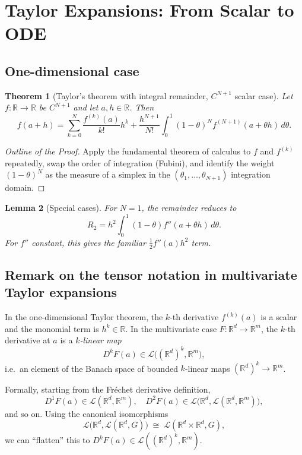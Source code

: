 \documentclass[12pt]{article}
\newtheorem{theorem}{Theorem}[section]
\newtheorem{lemma}[theorem]{Lemma}
\begin{document}
\section{Taylor Expansions: From Scalar to ODE}

\subsection{One-dimensional case}

\begin{theorem}[Taylor's theorem with integral remainder, $C^{N+1}$ scalar case]
Let $f:\mathbb{R} \to \mathbb{R}$ be $C^{N+1}$ and let $a,h \in \mathbb{R}$. Then
\[
f(a+h) = \sum_{k=0}^N \frac{f^{(k)}(a)}{k!} h^k 
+ \frac{h^{N+1}}{N!} \int_0^1 (1-\theta)^N f^{(N+1)}(a + \theta h)\,d\theta.
\]
\end{theorem}

\begin{proof}[Outline of the Proof]
Apply the fundamental theorem of calculus to $f$ and $f^{(k)}$ repeatedly, 
swap the order of integration (Fubini), and identify the weight $(1-\theta)^N$ 
as the measure of a simplex in the $(\theta_1,\dots,\theta_{N+1})$ integration domain.
\end{proof}

\begin{lemma}[Special cases]
For $N=1$, the remainder reduces to
\[
R_2 = h^2 \int_0^1 (1-\theta) f''(a+\theta h)\,d\theta.
\]
For $f''$ constant, this gives the familiar $\frac{1}{2}f''(a)h^2$ term.
\end{lemma}

\medskip

\subsection*{Remark on the tensor notation in multivariate Taylor expansions}

In the one-dimensional Taylor theorem, the $k$-th derivative $f^{(k)}(a)$ is a scalar 
and the monomial term is $h^k \in \mathbb{R}$. 
In the multivariate case $F:\mathbb{R}^d \to \mathbb{R}^m$, the $k$-th derivative 
at $a$ is a \emph{$k$-linear map} 
\[
D^kF(a) \in \mathcal{L}\big((\mathbb{R}^d)^k, \mathbb{R}^m\big),
\]
i.e.\ an element of the Banach space of bounded $k$-linear maps 
$(\mathbb{R}^d)^k \to \mathbb{R}^m$.

Formally, starting from the Fr\'echet derivative definition,
\[
D^1F(a) \in \mathcal{L}(\mathbb{R}^d, \mathbb{R}^m), \quad
D^2F(a) \in \mathcal{L}\big(\mathbb{R}^d, \mathcal{L}(\mathbb{R}^d, \mathbb{R}^m)\big),
\]
and so on. Using the canonical isomorphisms
\[
\mathcal{L}\big(\mathbb{R}^d, \mathcal{L}(\mathbb{R}^d, G)\big) 
\;\cong\; \mathcal{L}(\mathbb{R}^d \times \mathbb{R}^d, G),
\]
we can ``flatten'' this to $D^kF(a) \in \mathcal{L}((\mathbb{R}^d)^k, \mathbb{R}^m)$.
\end{document}

